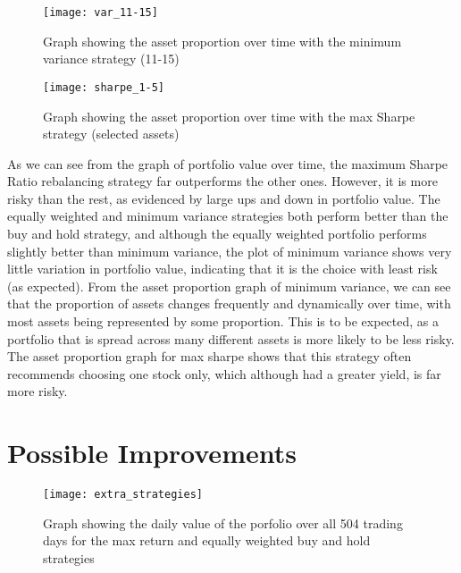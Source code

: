 \documentclass[english]{scrartcl}
\begin{document}
				\begin{figure}[!htb]
					\begin{center}
						\texttt{[image: var\_11-15]}
						
					\end{center}
					\caption{Graph showing the asset proportion over time with the minimum variance strategy (11-15)}
					\vspace{-10pt}
				\end{figure}
				
						\begin{figure}[!htb]
							\begin{center}
								\texttt{[image: sharpe\_1-5]}
								
							\end{center}
							\caption{Graph showing the asset proportion over time with the max Sharpe strategy (selected assets)}
							\vspace{-10pt}
						\end{figure}
						
						As we can see from the graph of portfolio value over time, the maximum Sharpe Ratio rebalancing strategy far outperforms the other ones. However, it is more risky than the rest, as evidenced by large ups and down in portfolio value. The equally weighted and minimum variance strategies both perform better than the buy and hold strategy, and although the equally weighted portfolio performs slightly better than minimum variance, the plot of minimum variance shows very little variation in portfolio value, indicating that it is the choice with least risk (as expected). From the asset proportion graph of minimum variance, we can see that the proportion of assets changes frequently and dynamically over time, with most assets being represented by some proportion. This is to be expected, as a portfolio that is spread across many different assets is more likely to be less risky. The asset proportion graph for max sharpe shows that this strategy often recommends choosing one stock only, which although had a greater yield, is far more risky. 
	\section{Possible Improvements}
	
							\begin{figure}[!htb]
								\begin{center}
									\texttt{[image: extra\_strategies]}
									
								\end{center}
								\caption{Graph showing the daily value of the porfolio over all 504 trading days for the max return and equally weighted buy and hold strategies}
								\vspace{-10pt}
							\end{figure}
	
\end{document}

